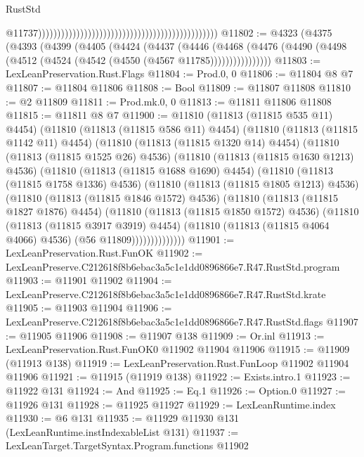 \begin{lexlean}{RustStd}
\begin{coremodule}
                                                                                                  @11737)))))))))))))))))))))))))))))))))))))))))))))))
@11802 := @4323
    (@4375
      (@4393
        (@4399
          (@4405
            (@4424
              (@4437
                (@4446
                  (@4468
                    (@4476 (@4490 (@4498 (@4512 (@4524 (@4542 (@4550 (@4567 @11785))))))))))))))))
@11803 := LexLeanPreservation.Rust.Flags
@11804 := Prod.{0, 0}
@11806 := @11804 @8 @7
@11807 := @11804 @11806
@11808 := Bool
@11809 := @11807 @11808
@11810 := @2 @11809
@11811 := Prod.mk.{0, 0}
@11813 := @11811 @11806 @11808
@11815 := @11811 @8 @7
@11900 := @11810
    (@11813 (@11815 @535 @11) @4454)
    (@11810
      (@11813 (@11815 @586 @11) @4454)
      (@11810
        (@11813 (@11815 @1142 @11) @4454)
        (@11810
          (@11813 (@11815 @1320 @14) @4454)
          (@11810
            (@11813 (@11815 @1525 @26) @4536)
            (@11810
              (@11813 (@11815 @1630 @1213) @4536)
              (@11810
                (@11813 (@11815 @1688 @1690) @4454)
                (@11810
                  (@11813 (@11815 @1758 @1336) @4536)
                  (@11810
                    (@11813 (@11815 @1805 @1213) @4536)
                    (@11810
                      (@11813 (@11815 @1846 @1572) @4536)
                      (@11810
                        (@11813 (@11815 @1827 @1876) @4454)
                        (@11810
                          (@11813 (@11815 @1850 @1572) @4536)
                          (@11810
                            (@11813 (@11815 @3917 @3919) @4454)
                            (@11810 (@11813 (@11815 @4064 @4066) @4536) (@56 @11809))))))))))))))
@11901 := LexLeanPreservation.Rust.FunOK
@11902 := LexLeanPreserve.C212618f8b6ebac3a5c1e1dd0896866e7.R47.RustStd.program
@11903 := @11901 @11902
@11904 := LexLeanPreserve.C212618f8b6ebac3a5c1e1dd0896866e7.R47.RustStd.krate
@11905 := @11903 @11904
@11906 := LexLeanPreserve.C212618f8b6ebac3a5c1e1dd0896866e7.R47.RustStd.flags
@11907 := @11905 @11906
@11908 := @11907 @138
@11909 := Or.inl
@11913 := LexLeanPreservation.Rust.FunOK0 @11902 @11904 @11906
@11915 := @11909 (@11913 @138)
@11919 := LexLeanPreservation.Rust.FunLoop @11902 @11904 @11906
@11921 := @11915 (@11919 @138)
@11922 := Exists.intro.{1}
@11923 := @11922 @131
@11924 := And
@11925 := Eq.{1}
@11926 := Option.{0}
@11927 := @11926 @131
@11928 := @11925 @11927
@11929 := LexLeanRuntime.index
@11930 := @6 @131
@11935 := @11929 @11930 @131 (LexLeanRuntime.instIndexableList @131)
@11937 := LexLeanTarget.TargetSyntax.Program.functions @11902

\end{coremodule}
\end{lexlean}
